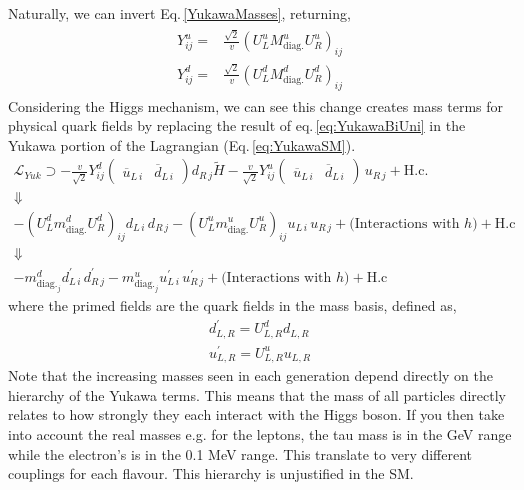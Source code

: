 Naturally, we can invert Eq.\,\ref{YukawaMasses}, returning, 
\begin{align}
\label{eq:YukawaBiUni}
\begin{split}
Y^u_{ij} = & \frac{\sqrt{2}}{v} (U_L^u M^u_{\text{diag.}} U_R^u)_{ij} \\
Y^d_{ij} = & \frac{\sqrt{2}}{v} (U_L^d M^d_{\text{diag.}} U_R^d)_{ij}
\end{split}
\end{align}
%
Considering the Higgs mechanism, we can see this change creates mass terms for physical quark fields by replacing the result of eq.\,\ref{eq:YukawaBiUni} in the Yukawa portion of the Lagrangian (Eq.\,\ref{eq:YukawaSM}).
%
\begin{gather}
\mathcal{L}_{Yuk} \supset 
- \frac{v}{\sqrt{2}} Y^d_{ij} \begin{pmatrix} \overline{u}_{L\,i} & \overline{d}_{L\,i}  \end{pmatrix}  d_{R\,j} \tilde{H}
%
-\frac{v}{\sqrt{2}} Y^u_{ij} \begin{pmatrix} \overline{u}_{L\,i} & \overline{d}_{L\,i}  \end{pmatrix} \, u_{R\,j} + \text{H.c.} \nonumber  \\ 
 \Downarrow \nonumber \\
-(U_L^d m^d_{\text{diag.}} U_R^d)_{ij} d_{L\,i} \, d_{R\,j}  - (U_L^u m^u_{\text{diag.}} U_R^u)_{ij} u_{L\,i} \, u_{R\,j} + \big(\text{Interactions with } h\big) + \text{H.c} \\ 
 \Downarrow  \nonumber \\ 
-m^d_{\text{diag.}_j} d_{L\,i}^\prime \, d_{R\,j}^\prime  - m^u_{\text{diag.}_j} u_{L\,i}^\prime \, u_{R\,j}^\prime + \big(\text{Interactions with }h\big) + \text{H.c}  \nonumber  
\end{gather}
%
where the primed fields are the quark fields in the mass basis, defined as, 
\begin{equation}
\begin{split}
d^\prime_{L,R} = U^d_{L,R} d_{L,R} \\
u^\prime_{L,R} = U^u_{L,R} u_{L,R} 
\end{split}  
\end{equation}
% 
Note that the increasing masses seen in each generation depend directly on the  hierarchy of the Yukawa terms. This means that the mass of all particles directly relates to how strongly they each interact with the Higgs boson.
%
If you then take into account the real masses e.g. for the leptons, the tau mass is in the GeV range while the electron's is in the 0.1 MeV range. This translate to very different couplings for each flavour. 
%
This hierarchy is unjustified in the SM. 

